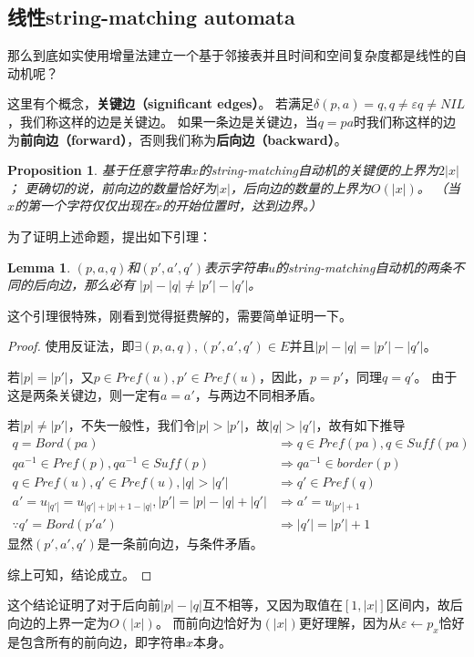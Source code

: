 \documentclass[UTF8]{ctexart}
\newtheorem{lem}[thm]{Lemma}
\newtheorem{prop}[thm]{Proposition}
\theoremstyle{definition}
\theoremstyle{remark}
\numberwithin{equation}{subsection}
\newcommand\Emph{\textbf}
\begin{document}
\subsection{线性string-matching automata}
	
	那么到底如实使用增量法建立一个基于邻接表并且时间和空间复杂度都是线性的自动机呢？
	
	这里有个概念，\Emph{关键边（significant edges）}。
	若满足$\delta(p,a)=q, q \neq \varepsilon q \neq NIL$，我们称这样的边是关键边。
	如果一条边是关键边，当$q=pa$时我们称这样的边为\Emph{前向边（forward）}，否则我们称为\Emph{后向边（backward）}。
	
	\begin{prop}
		基于任意字符串$x$的string-matching自动机的关键便的上界为$2|x|$；
		更确切的说，前向边的数量恰好为$|x|$，后向边的数量的上界为$O(|x|)$。
		（当$x$的第一个字符仅仅出现在$x$的开始位置时，达到边界。）
	\end{prop}
	为了证明上述命题，提出如下引理：
	\begin{lem}
		$(p,a,q)$和$(p',a',q')$表示字符串$u$的string-matching自动机的两条不同的后向边，那么必有
		$|p| - |q| \neq |p'| - |q'|$。
	\end{lem}
	这个引理很特殊，刚看到觉得挺费解的，需要简单证明一下。
	\begin{proof}
		使用反证法，即$\exists (p,a,q),(p',a',q') \in E$并且$|p|-|q| = |p'|-|q'|$。
		
		若$|p|=|p'|$，又$p \in Pref(u), p' \in Pref(u)$，因此，$p = p'$，同理$q = q'$。
		由于这是两条关键边，则一定有$a=a'$，与两边不同相矛盾。
		
		若$|p| \neq |p'|$，不失一般性，我们令$|p| > |p'|$，故$|q| > |q'|$，故有如下推导
		\begin{align*}
			q = Bord(pa)	&\Rightarrow q \in Pref(pa), q \in Suff(pa)	\\
			qa^{-1} \in Pref(p), qa^{-1} \in Suff(p)	&\Rightarrow qa^{-1} \in border(p)	\\
			q \in Pref(u), q' \in Pref(u), |q|>|q'| &\Rightarrow q' \in Pref(q)	\\
			a' = u_{|q'|} = u_{|q'|+|p|+1-|q|}, |p'|=|p|-|q|+|q'| &\Rightarrow a' = u_{|p'|+1}	\\
			\because q' = Bord(p'a') &\Rightarrow |q'|=|p'|+1
		\end{align*}
		显然$(p',a',q')$是一条前向边，与条件矛盾。
		
		综上可知，结论成立。
	\end{proof}
	这个结论证明了对于后向前$|p|-|q|$互不相等，又因为取值在$[1,|x|]$区间内，故后向边的上界一定为$O(|x|)$。
	而前向边恰好为$(|x|)$更好理解，因为从$\varepsilon \leftarrow p_{x}$恰好是包含所有的前向边，即字符串$x$本身。
	
\end{document}
